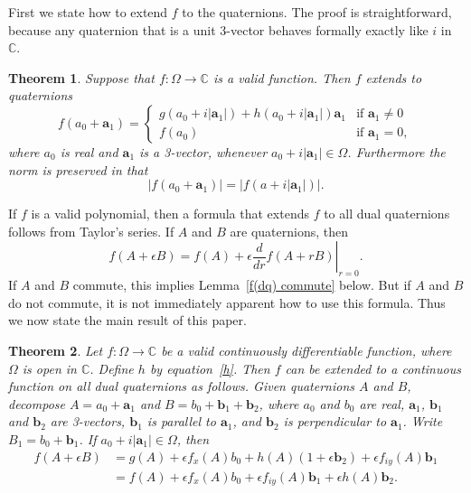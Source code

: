 \documentclass[12pt,reqno]{amsart}
\newtheorem{theorem}{Theorem}
\begin{document}
First we state how to extend $f$ to the quaternions.  The proof is straightforward, because any quaternion that is a unit 3-vector behaves formally exactly like $i$ in $\mathbb C$.

\begin{theorem}
\label{f(q)}
Suppose that $f:\Omega \to \mathbb C$ is a valid function.  Then $f$ extends to quaternions
\begin{equation}
f(a_0 + \bm a_1) = \begin{cases}
g(a_0+i|\bm a_1|) +h(a_0+i|\bm a_1|) \bm a_1 & \text{if $\bm a_1 \ne 0$} \\
f(a_0) & \text{if $\bm a_1 = 0$}, \end{cases}
\end{equation}
where $a_0$ is real and $\bm a_1$ is a 3-vector, whenever $a_0 + i|\bm a_1| \in \Omega$.  Furthermore the norm is preserved in that
\begin{equation}
| f(a_0 + \bm a_1) | = | f(a + i |\bm a_1|) | .
\end{equation}
\end{theorem}

If $f$ is a valid polynomial, then a formula that extends $f$ to all dual quaternions follows from Taylor's series.  If $A$ and $B$ are quaternions, then
\begin{equation}
\label{proto f(dq)}
f(A + \epsilon B) = f(A) + \epsilon \left.\frac d{dr} f(A + rB) \right|_{r=0}.
\end{equation}
If $A$ and $B$ commute, this implies Lemma~\ref{f(dq) commute} below.  But if $A$ and $B$ do not commute, it is not immediately apparent how to use this formula.  Thus we now state the main result of this paper.

\begin{theorem}
\label{f(dq)}
Let $f:\Omega \to \mathbb C$ be a valid continuously differentiable function, where $\Omega$ is open in $\mathbb C$.  Define $h$ by equation~\eqref{h}.  Then $f$ can be extended to a continuous function on all dual quaternions as follows.  Given quaternions $A$ and $B$, decompose $A = a_0 + \bm a_1$ and $B = b_0 + \bm b_1 + \bm b_2$, where $a_0$ and $b_0$ are real, $\bm a_1$, $\bm b_1$ and $\bm b_2$ are 3-vectors, $\bm b_1$ is parallel to $\bm a_1$, and $\bm b_2$ is perpendicular to $\bm a_1$.  Write $B_1 = b_0 + \bm b_1$.  If $a_0 + i |\bm a_1| \in \Omega$, then
\begin{align}
f(A + \epsilon B)
&= g(A) 
+ \epsilon f_x(A) b_0
+ h(A) (1 + \epsilon \bm b_2)
+ \epsilon f_{iy}(A) \bm b_1 \\
&= f(A) 
+ \epsilon f_x(A) b_0
+ \epsilon f_{iy}(A) \bm b_1
+ \epsilon h(A) \bm b_2 .
\end{align}
\end{theorem}
\end{document}

